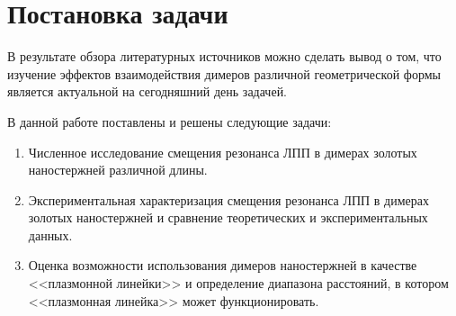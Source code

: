 \section{Постановка задачи}

В результате обзора литературных источников можно сделать вывод о том, что изучение эффектов взаимодействия димеров различной геометрической формы  является актуальной на сегодняшний день задачей.

В данной работе поставлены и решены следующие задачи:
\begin{enumerate}
\item Численное исследование смещения резонанса ЛПП в димерах золотых наностержней различной длины.
\item Экспериментальная характеризация смещения резонанса ЛПП в димерах золотых наностержней и сравнение теоретических и экспериментальных данных.
\item Оценка возможности использования димеров наностержней в качестве <<плазмонной линейки>> и определение диапазона расстояний, в котором <<плазмонная линейка>> может функционировать.
\end{enumerate}